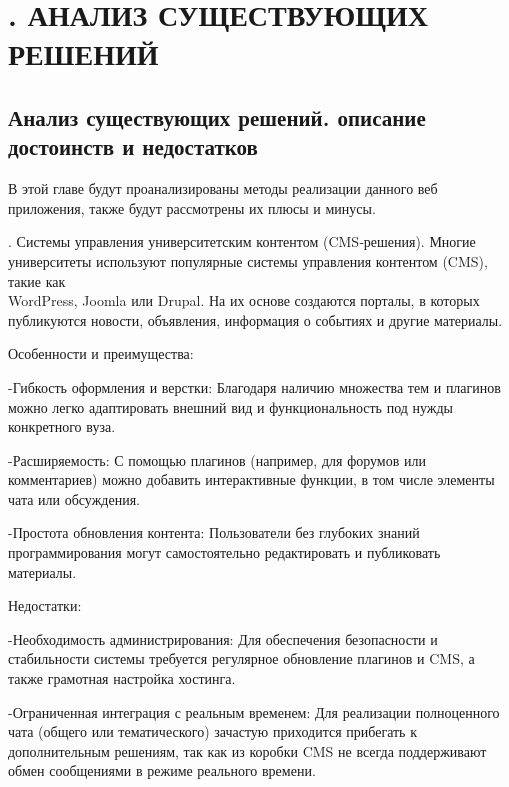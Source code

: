 \sectionbreak \section*{
	\cyrillicfont 
	\fontsize{14pt}{0pt}\selectfont
	\englishfont 
	. АНАЛИЗ СУЩЕСТВУЮЩИХ РЕШЕНИЙ
}

\titlespace
\subsection*{ 
	\gostTitleFont
	 Анализ существующих решений. описание достоинств и недостатков
} 
{\gostFont
	
	\par \redline В этой главе будут проанализированы методы реализации данного веб приложения, также будут рассмотрены их плюсы и минусы. 
	
	\par {}. Системы управления университетским контентом (CMS‑решения). Многие университеты используют популярные системы управления контентом (CMS), такие как \\ WordPress, Joomla или Drupal. На их основе создаются порталы, в которых публикуются новости, объявления, информация о событиях и другие материалы.
	
	\par \redline Особенности и преимущества:
	
	\par \redline -Гибкость оформления и верстки: Благодаря наличию множества тем и плагинов можно легко адаптировать внешний вид и функциональность под нужды конкретного вуза.
	
	\par \redline -Расширяемость: С помощью плагинов (например, для форумов или комментариев) можно добавить интерактивные функции, в том числе элементы чата или обсуждения.
	
	\par \redline -Простота обновления контента: Пользователи без глубоких знаний программирования могут самостоятельно редактировать и публиковать материалы.
	
	\par \redline Недостатки:
	
	\par \redline -Необходимость администрирования: Для обеспечения безопасности и стабильности системы требуется регулярное обновление плагинов и CMS, а также грамотная настройка хостинга.
	
	\par \redline -Ограниченная интеграция с реальным временем: Для реализации полноценного чата (общего или тематического) зачастую приходится прибегать к дополнительным решениям, так как из коробки CMS не всегда поддерживают обмен сообщениями в режиме реального времени. 
	
}
